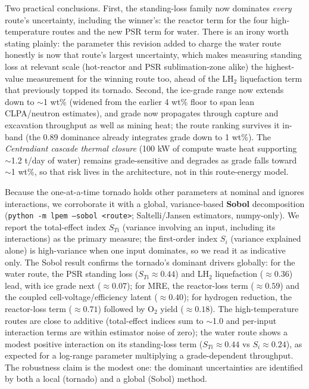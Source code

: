 \documentclass[11pt,a4paper]{article}
\begin{document}
Two practical conclusions. First, the standing-loss family now dominates \emph{every}
route's uncertainty, including the winner's: the reactor term for the four
high-temperature routes and the new PSR term for water. There is an irony worth stating
plainly: the parameter this revision added to charge the water route honestly is now that
route's largest uncertainty, which makes measuring standing loss at relevant scale
(hot-reactor and PSR sublimation-zone alike) the highest-value measurement for the winning
route too, ahead of the LH$_2$ liquefaction term that previously topped its tornado.
Second, the ice-grade range now extends down to $\sim$1 wt\% (widened from the earlier
4 wt\% floor to span lean CLPA/neutron estimates), and grade now propagates through
capture and excavation throughput as well as mining heat; the route ranking survives it
in-band (the 0.89 dominance already integrates grade down to 1 wt\%). The
\emph{Centradiant cascade thermal closure} (100 kW of compute waste heat supporting
$\sim$1.2 t/day of water) remains grade-sensitive and degrades as grade falls toward
$\sim$1 wt\%, so that risk lives in the architecture, not in this route-energy model.

Because the one-at-a-time tornado holds other parameters at nominal and ignores
interactions, we corroborate it with a global, variance-based \textbf{Sobol}
decomposition (\texttt{python -m lpem --sobol <route>}; Saltelli/Jansen estimators,
numpy-only). We report the total-effect index $S_{Ti}$ (variance involving an input,
including its interactions) as the primary measure; the first-order index $S_i$ (variance
explained alone) is high-variance when one input dominates, so we read it as indicative
only. The Sobol result confirms the tornado's dominant drivers globally: for the water
route, the PSR standing loss ($S_{Ti}\approx0.44$) and LH$_2$ liquefaction ($\approx0.36$)
lead, with ice grade next ($\approx0.07$); for MRE, the reactor-loss term ($\approx0.59$)
and the coupled cell-voltage/efficiency latent ($\approx0.40$); for hydrogen reduction,
the reactor-loss term ($\approx0.71$) followed by O$_2$ yield ($\approx0.18$). The
high-temperature routes are close to additive (total-effect indices sum to $\sim$1.0 and
per-input interaction terms are within estimator noise of zero); the water route shows a
modest positive interaction on its standing-loss term ($S_{Ti}\approx0.44$ vs
$S_i\approx0.24$), as expected for a log-range parameter multiplying a grade-dependent
throughput. The robustness claim is the modest one: the dominant uncertainties are
identified by both a local (tornado) and a global (Sobol) method.
\end{document}
